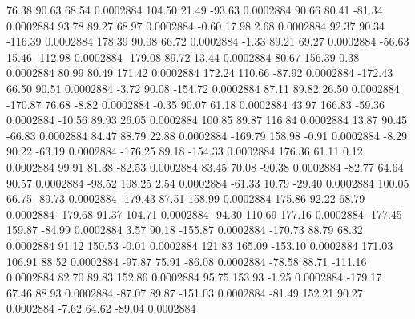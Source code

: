        76.38       90.63       68.54     0.0002884
      104.50       21.49      -93.63     0.0002884
       90.66       80.41      -81.34     0.0002884
       93.78       89.27       68.97     0.0002884
       -0.60       17.98        2.68     0.0002884
       92.37       90.34     -116.39     0.0002884
      178.39       90.08       66.72     0.0002884
       -1.33       89.21       69.27     0.0002884
      -56.63       15.46     -112.98     0.0002884
     -179.08       89.72       13.44     0.0002884
       80.67      156.39        0.38     0.0002884
       80.99       80.49      171.42     0.0002884
      172.24      110.66      -87.92     0.0002884
     -172.43       66.50       90.51     0.0002884
       -3.72       90.08     -154.72     0.0002884
       87.11       89.82       26.50     0.0002884
     -170.87       76.68       -8.82     0.0002884
       -0.35       90.07       61.18     0.0002884
       43.97      166.83      -59.36     0.0002884
      -10.56       89.93       26.05     0.0002884
      100.85       89.87      116.84     0.0002884
       13.87       90.45      -66.83     0.0002884
       84.47       88.79       22.88     0.0002884
     -169.79      158.98       -0.91     0.0002884
       -8.29       90.22      -63.19     0.0002884
     -176.25       89.18     -154.33     0.0002884
      176.36       61.11        0.12     0.0002884
       99.91       81.38      -82.53     0.0002884
       83.45       70.08      -90.38     0.0002884
      -82.77       64.64       90.57     0.0002884
      -98.52      108.25        2.54     0.0002884
      -61.33       10.79      -29.40     0.0002884
      100.05       66.75      -89.73     0.0002884
     -179.43       87.51      158.99     0.0002884
      175.86       92.22       68.79     0.0002884
     -179.68       91.37      104.71     0.0002884
      -94.30      110.69      177.16     0.0002884
     -177.45      159.87      -84.99     0.0002884
        3.57       90.18     -155.87     0.0002884
     -170.73       88.79       68.32     0.0002884
       91.12      150.53       -0.01     0.0002884
      121.83      165.09     -153.10     0.0002884
      171.03      106.91       88.52     0.0002884
      -97.87       75.91      -86.08     0.0002884
      -78.58       88.71     -111.16     0.0002884
       82.70       89.83      152.86     0.0002884
       95.75      153.93       -1.25     0.0002884
     -179.17       67.46       88.93     0.0002884
      -87.07       89.87     -151.03     0.0002884
      -81.49      152.21       90.27     0.0002884
       -7.62       64.62      -89.04     0.0002884
